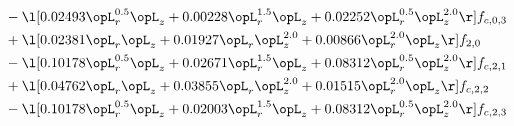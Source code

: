 \begin{alignat}{2}
& - \l[  0.02493 \opL_r^{0.5} \opL_z +  0.00228 \opL_r^{1.5} \opL_z +  0.02252 \opL_r^{0.5} \opL_z^{2.0}  \r] f_{c,0,3} \nonumber \\ 
& + \l[  0.02381 \opL_r \opL_z +  0.01927 \opL_r \opL_z^{2.0} +  0.00866 \opL_r^{2.0} \opL_z  \r] f_{2,0} \nonumber \\ 
& - \l[  0.10178 \opL_r^{0.5} \opL_z +  0.02671 \opL_r^{1.5} \opL_z +  0.08312 \opL_r^{0.5} \opL_z^{2.0}  \r] f_{c,2,1} \nonumber \\ 
& + \l[  0.04762 \opL_r \opL_z +  0.03855 \opL_r \opL_z^{2.0} +  0.01515 \opL_r^{2.0} \opL_z  \r] f_{c,2,2} \nonumber \\ 
& - \l[  0.10178 \opL_r^{0.5} \opL_z +  0.02003 \opL_r^{1.5} \opL_z +  0.08312 \opL_r^{0.5} \opL_z^{2.0}  \r] f_{c,2,3} \nonumber \\ 
\end{alignat} 


